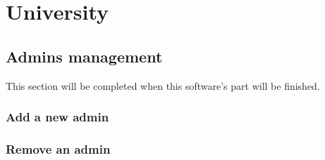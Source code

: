 \documentclass[ManualeUtente.tex]{subfiles}
\begin{document}
\chapter{University}
\section{Admins management}
This section will be completed when this software's part will be finished.
\subsection{Add a new admin}
\subsection{Remove an admin}
\end{document}
